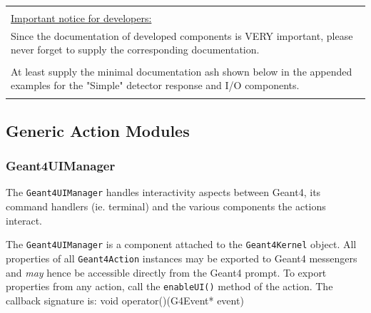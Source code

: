 \documentclass[10pt,a4paper]{article}
\begin{document}
\vspace{5cm}

\begin{center}
{\large{\bf{
\begin{tabular} {| p{15cm} |}
\hline\space  \\

\noindent
{\underline{Important notice for developers:}} \\

\noindent
Since the documentation of developed components is VERY important,
please never forget to supply the corresponding documentation.\\
\\
\noindent
At least supply the minimal documentation ash shown below
in the appended examples for the "Simple" detector response and I/O
components.
\\ \space\hline 
\end{tabular}
}}}
\end{center}
\clearpage

\subsection{Generic Action Modules}
\noindent
\subsubsection{Geant4UIManager}
\noindent
The {\tt{Geant4UIManager}} handles interactivity aspects between Geant4,
its command handlers (ie. terminal) and the various components the actions
interact.

\noindent
The {\tt{Geant4UIManager}} is a component attached to the {\tt{Geant4Kernel}}
object. All properties of all {\tt{Geant4Action}} instances may be exported to 
Geant4 messengers and {\em{may}} hence be accessible directly from the Geant4 
prompt. To export properties from any action, call the {\tt{enableUI()}}
method of the action.
\noindent
The callback signature is: void operator()(G4Event* event)
\end{document}
